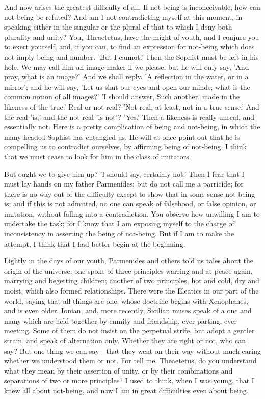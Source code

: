 \documentclass[11pt,letter]{article}
\begin{document}
\par  And now arises the greatest difficulty of all. If not-being is inconceivable, how can not-being be refuted? And am I not contradicting myself at this moment, in speaking either in the singular or the plural of that to which I deny both plurality and unity? You, Theaetetus, have the might of youth, and I conjure you to exert yourself, and, if you can, to find an expression for not-being which does not imply being and number. 'But I cannot.' Then the Sophist must be left in his hole. We may call him an image-maker if we please, but he will only say, 'And pray, what is an image?' And we shall reply, 'A reflection in the water, or in a mirror'; and he will say, 'Let us shut our eyes and open our minds; what is the common notion of all images?' 'I should answer, Such another, made in the likeness of the true.' Real or not real? 'Not real; at least, not in a true sense.' And the real 'is,' and the not-real 'is not'? 'Yes.' Then a likeness is really unreal, and essentially not. Here is a pretty complication of being and not-being, in which the many-headed Sophist has entangled us. He will at once point out that he is compelling us to contradict ourselves, by affirming being of not-being. I think that we must cease to look for him in the class of imitators.

\par  But ought we to give him up? 'I should say, certainly not.' Then I fear that I must lay hands on my father Parmenides; but do not call me a parricide; for there is no way out of the difficulty except to show that in some sense not-being is; and if this is not admitted, no one can speak of falsehood, or false opinion, or imitation, without falling into a contradiction. You observe how unwilling I am to undertake the task; for I know that I am exposing myself to the charge of inconsistency in asserting the being of not-being. But if I am to make the attempt, I think that I had better begin at the beginning.

\par  Lightly in the days of our youth, Parmenides and others told us tales about the origin of the universe: one spoke of three principles warring and at peace again, marrying and begetting children; another of two principles, hot and cold, dry and moist, which also formed relationships. There were the Eleatics in our part of the world, saying that all things are one; whose doctrine begins with Xenophanes, and is even older. Ionian, and, more recently, Sicilian muses speak of a one and many which are held together by enmity and friendship, ever parting, ever meeting. Some of them do not insist on the perpetual strife, but adopt a gentler strain, and speak of alternation only. Whether they are right or not, who can say? But one thing we can say—that they went on their way without much caring whether we understood them or not. For tell me, Theaetetus, do you understand what they mean by their assertion of unity, or by their combinations and separations of two or more principles? I used to think, when I was young, that I knew all about not-being, and now I am in great difficulties even about being.
\end{document}
